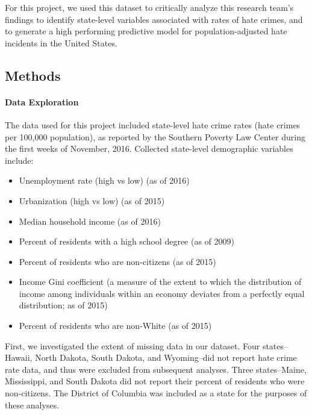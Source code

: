 \documentclass[
]{article}
\providecommand{\tightlist}{%
  \setlength{\itemsep}{0pt}\setlength{\parskip}{0pt}}
\begin{document}
For this project, we used this dataset to critically analyze this
research team's findings to identify state-level variables associated
with rates of hate crimes, and to generate a high performing predictive
model for population-adjusted hate incidents in the United States.

\hypertarget{methods}{%
\subsection{Methods}\label{methods}}

\hypertarget{data-exploration}{%
\paragraph{Data Exploration}\label{data-exploration}}

The data used for this project included state-level hate crime rates
(hate crimes per 100,000 population), as reported by the Southern
Poverty Law Center during the first weeks of November, 2016. Collected
state-level demographic variables include:

\begin{itemize}
\tightlist
\item
  Unemployment rate (high vs low) (as of 2016)
\item
  Urbanization (high vs low) (as of 2015)
\item
  Median household income (as of 2016)
\item
  Percent of residents with a high school degree (as of 2009)
\item
  Percent of residents who are non-citizens (as of 2015)
\item
  Income Gini coefficient (a measure of the extent to which the
  distribution of income among individuals within an economy deviates
  from a perfectly equal distribution; as of 2015)
\item
  Percent of residents who are non-White (as of 2015)
\end{itemize}

First, we investigated the extent of missing data in our dataset. Four
states--Hawaii, North Dakota, South Dakota, and Wyoming--did not report
hate crime rate data, and thus were excluded from subsequent analyses.
Three states--Maine, Mississippi, and South Dakota did not report their
percent of residents who were non-citizens. The District of Columbia was
included as a state for the purposes of these analyses.
\end{document}
